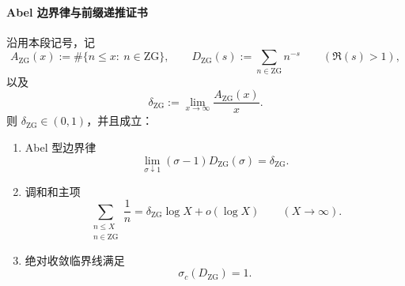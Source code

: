 \paragraph{Abel 边界律与前缀递推证书}

\begin{theorem}[ZG 的 Dirichlet 级数在 \texorpdfstring{$s=1$}{s=1} 的 Abel 型边界律、调和主项与收敛临界线]\label{thm:xi-zg-abel-residue-log-density}
沿用本段记号，记
\[
A_{\mathrm{ZG}}(x):=\#\{n\le x:\ n\in\mathrm{ZG}\},
\qquad
D_{\mathrm{ZG}}(s):=\sum_{n\in\mathrm{ZG}}n^{-s}
\qquad (\Re(s)>1),
\]
以及
\[
\delta_{\mathrm{ZG}}:=\lim_{x\to\infty}\frac{A_{\mathrm{ZG}}(x)}{x}.
\]
则 \(\delta_{\mathrm{ZG}}\in(0,1)\)，并且成立：
\begin{enumerate}
  \item Abel 型边界律
  \[
  \lim_{\sigma\downarrow 1}(\sigma-1)D_{\mathrm{ZG}}(\sigma)=\delta_{\mathrm{ZG}}.
  \]
  \item 调和和主项
  \[
  \sum_{\substack{n\le X\\ n\in\mathrm{ZG}}}\frac{1}{n}
  =\delta_{\mathrm{ZG}}\log X+o(\log X)
  \qquad (X\to\infty).
  \]
  \item 绝对收敛临界线满足
  \[
  \sigma_c(D_{\mathrm{ZG}})=1.
  \]
\end{enumerate}
\end{theorem}
